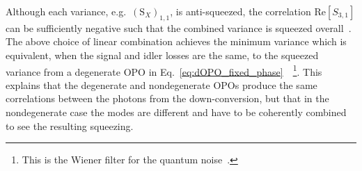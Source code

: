 Although each variance, e.g.\ $(\text{S}_X)_{1,1}$, is anti-squeezed, the correlation $\text{Re}[S_{3,1}]$ can be sufficiently negative such that the combined variance is squeezed overall~\cite{}. The above choice of linear combination achieves the minimum variance which is equivalent, when the signal and idler losses are the same, to the squeezed variance from a degenerate OPO in Eq.~\ref{eq:dOPO_fixed_phase}~\cite{}~\footnote{This is the Wiener filter for the quantum noise~\cite{}.}.
This explains that the degenerate and nondegenerate OPOs produce the same correlations between the photons from the down-conversion, but that in the nondegenerate case the modes are different and have to be coherently combined to see the resulting squeezing. %

